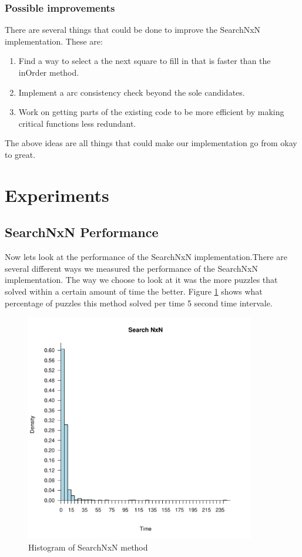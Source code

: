 \documentclass[letterpaper]{article}
\begin{document}
\subsubsection{Possible improvements}
There are several things that could be done to improve the SearchNxN implementation. These are:
\begin{enumerate}
\item Find a way to select a the next square to fill in that is faster than the inOrder method.
\item Implement a arc consistency check beyond the sole candidates.
\item Work on getting parts of the existing code to be more efficient by making critical functions less redundant. 
\end{enumerate}
The above ideas are all things that could make our implementation go from okay to great.

\section{Experiments}

\subsection{SearchNxN Performance}
Now lets look at the performance of the SearchNxN implementation.There are several different ways we measured the performance of the SearchNxN implementation. The way we choose to look at it was the more puzzles that solved within a certain amount of time the better. Figure \ref{fig:search-time-complex-hist} shows what percentage of puzzles this method solved per time 5 second time intervale.

\begin{figure}[h]
	\centering
	\includegraphics[width=100mm]{../stats/searchNxNEasy.pdf}
	\caption{Histogram of SearchNxN method}
	\label{fig:search-time-complex-hist}
\end{figure}
\end{document}
